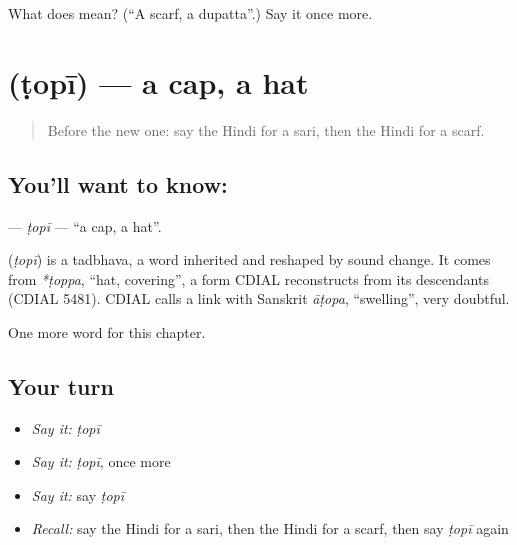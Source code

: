 \begin{tcolorbox}[breakable,colback=teal!4,colframe=teal!35!black,title={Before you move on}]
What does  mean? (\textquotedblleft{}A scarf, a dupatta\textquotedblright{}.) Say it once more.
\end{tcolorbox}
\section[\texorpdfstring{\hi{टोपी} (ṭopī)}{टोपी (ṭopī)}]{ (ṭopī) — a cap, a hat}

\label{lesson:HI-C136-topi}



\begin{quote}
Before the new one: say the Hindi for a sari, then the Hindi for a scarf.
\end{quote}

\subsection*{You'll want to know: }
\textbf{} — \emph{ṭopī} — \textquotedblleft{}a cap, a hat\textquotedblright{}.

\begin{cousinweb}
\textbf{} (\emph{ṭopī}) is a tadbhava, a word inherited and reshaped by sound change. It comes from \emph{*ṭoppa}, \textquotedblleft{}hat, covering\textquotedblright{}, a form CDIAL reconstructs from its descendants (CDIAL 5481). CDIAL calls a link with Sanskrit \emph{āṭopa}, \textquotedblleft{}swelling\textquotedblright{}, very doubtful.
\end{cousinweb}

\begin{grammarlens}[title={What you've built}]
One more word for this chapter.
\end{grammarlens}

\subsection*{Your turn}
\begin{itemize}
\raggedright
  \item \emph{Say it:} \emph{ṭopī}
  \item \emph{Say it:} \emph{ṭopī}, once more
  \item \emph{Say it:} say \emph{ṭopī}
  \item \emph{Recall:} say the Hindi for a sari, then the Hindi for a scarf, then say \emph{ṭopī} again
\end{itemize}

